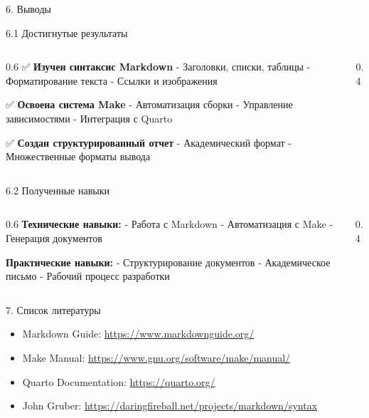 \documentclass[
  ignorenonframetext,
  aspectratio=169,
]{beamer}
\providecommand{\tightlist}{%
  \setlength{\itemsep}{0pt}\setlength{\parskip}{0pt}}\usepackage{longtable,booktabs,array}
\newlength{\cslhangindent}
\newenvironment{CSLReferences}[2] %
 {\begin{list}{}{%
  \setlength{\itemindent}{0pt}
  \setlength{\leftmargin}{0pt}
  \setlength{\parsep}{0pt}
  \ifodd #1
   \setlength{\leftmargin}{\cslhangindent}
   \setlength{\itemindent}{-1\cslhangindent}
  \fi
  \setlength{\itemsep}{#2\baselineskip}}}
 {\end{list}}
\begin{document}
\begin{frame}{6. Выводы}
\label{ux432ux44bux432ux43eux434ux44b}
\begin{block}{6.1 Достигнутые результаты}
\label{ux434ux43eux441ux442ux438ux433ux43dux443ux442ux44bux435-ux440ux435ux437ux443ux43bux44cux442ux430ux442ux44b}
\begin{columns}[c]
\begin{column}{0.6\textwidth}
✅ \textbf{Изучен синтаксис Markdown} - Заголовки, списки, таблицы -
Форматирование текста - Ссылки и изображения

✅ \textbf{Освоена система Make} - Автоматизация сборки - Управление
зависимостями - Интеграция с Quarto

✅ \textbf{Создан структурированный отчет} - Академический формат -
Множественные форматы вывода
\end{column}

\begin{column}{0.4\textwidth}
\end{column}
\end{columns}
\end{block}

\begin{block}{6.2 Полученные навыки}
\label{ux43fux43eux43bux443ux447ux435ux43dux43dux44bux435-ux43dux430ux432ux44bux43aux438}
\begin{columns}[c]
\begin{column}{0.6\textwidth}
\textbf{Технические навыки:} - Работа с Markdown - Автоматизация с Make
- Генерация документов

\textbf{Практические навыки:} - Структурирование документов -
Академическое письмо - Рабочий процесс разработки
\end{column}

\begin{column}{0.4\textwidth}
\end{column}
\end{columns}
\end{block}
\end{frame}

\begin{frame}{7. Список литературы}
\label{ux441ux43fux438ux441ux43eux43a-ux43bux438ux442ux435ux440ux430ux442ux443ux440ux44b}
\label{refs}
\begin{CSLReferences}{0}{1}
\begin{itemize}[<+->]
\tightlist
\item
  Markdown Guide: \url{https://www.markdownguide.org/}
\item
  Make Manual: \url{https://www.gnu.org/software/make/manual/}
\item
  Quarto Documentation: \url{https://quarto.org/}
\item
  John Gruber: \url{https://daringfireball.net/projects/markdown/syntax}
\end{itemize}

\end{CSLReferences}
\end{frame}
\end{document}
